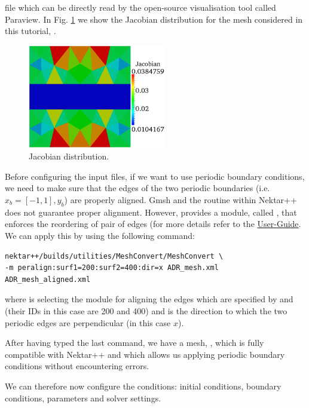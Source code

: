 file which can be directly read by the open-source visualisation tool
called Paraview. In Fig. \ref{f:Jac} we show the Jacobian distribution
for the mesh considered in this tutorial, .
%
\begin{figure}[h!]
\begin{center}
\includegraphics[width=6cm]{Figures/ADR_mesh_jacobian.png}
\caption{Jacobian distribution.}
\label{f:Jac}
\end{center}
\end{figure}
%
Before configuring the input files, if we want to use periodic boundary conditions, we 
need to make sure that the edges of the two periodic boundaries (i.e. $x_{b} = [-1, 1],
y_{b}$) are properly aligned. Gmsh and the  routine within Nektar++ 
does not guarantee proper alignment. However,  provides a module, 
called , that enforces the reordering of pair of edges (for more details 
refer to the \href{http://www.nektar.info/downloads/8}{User-Guide}. 
We can apply this by using the following command:
%
\begin{lstlisting}[style=BashInputStyle]
nektar++/builds/utilities/MeshConvert/MeshConvert \
-m peralign:surf1=200:surf2=400:dir=x ADR_mesh.xml ADR_mesh_aligned.xml
\end{lstlisting}
%
where  is selecting the module for aligning the edges which are 
specified by \inltt{surf1} and \inltt{surf2} (their IDs in this case are 200 and 400) 
and \inltt{dir} is the direction to which the two periodic edges are perpendicular 
(in this case $x$).

After having typed the last command, we have a mesh, ,
which is fully compatible with Nektar++ and which allows us applying periodic boundary 
conditions without encountering errors. 

We can therefore now configure the conditions: initial conditions, boundary conditions, 
parameters and solver settings. 

